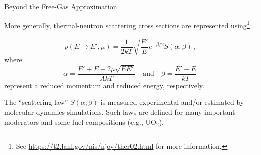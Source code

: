 \documentclass[aspectratio=1610]{beamer}
\begin{document}
\begin{frame}[fragile]{Beyond the Free-Gas Approximation}
 
More generally, thermal-neutron scattering cross sections are represented
using\footnote{See \url{https://t2.lanl.gov/nis/njoy/ther02.html} 
for more information.}

\begin{equation*}
 p(E\to E', \mu) = \frac{1}{2kT} \sqrt{\frac{E'}{E}} e^{-\beta/2} S(\alpha, \beta) \, ,
\end{equation*}
where 
\begin{equation*}
 \alpha = \frac{E' + E -2\mu\sqrt{EE'}}{A kT} \quad \text{and} \quad \beta = \frac{E'-E}{kT} \, 
\end{equation*}
represent a reduced momentum and reduced energy, respectively.

\vfill 

The ``scattering law'' $S(\alpha, \beta)$ is measured experimental and/or estimated 
by molecular dynamics simulations.  Such laws are defined for many important 
moderators and some fuel compositions (e.g., UO$_2$).  
 
\end{frame}
\end{document}

